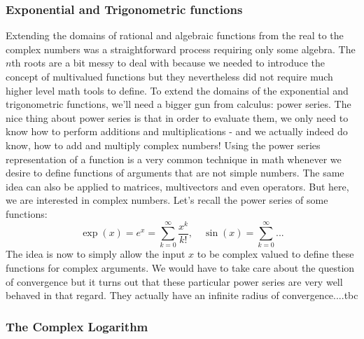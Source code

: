 \subsubsection{Exponential and Trigonometric functions}
Extending the domains of rational and algebraic functions from the real to the complex numbers was a straightforward process requiring only some algebra. The $n$th roots are a bit messy to deal with because we needed to introduce the concept of multivalued functions but they nevertheless did not require much higher level math tools to define. To extend the domains of the exponential and trigonometric functions, we'll need a bigger gun from calculus: power series. The nice thing about power series is that in order to evaluate them, we only need to know how to perform additions and multiplications - and we actually indeed do know, how to add and multiply complex numbers! Using the power series representation of a function is a very common technique in math whenever we desire to define functions of arguments that are not simple numbers. The same idea can also be applied to matrices, multivectors and even operators. But here, we are interested in complex numbers. Let's recall the power series of some functions:
\begin{equation}
 \exp(x) = e^x = \sum_{k=0}^{\infty} \frac{x^k}{k!}, \quad
 \sin(x) =  \sum_{k=0}^{\infty} ...
\end{equation}
The idea is now to simply allow the input $x$ to be complex valued to define these functions for complex arguments. We would have to take care about the question of convergence but it turns out that these particular power series are very well behaved in that regard. They actually have an infinite radius of convergence....tbc



\subsubsection{The Complex Logarithm}


